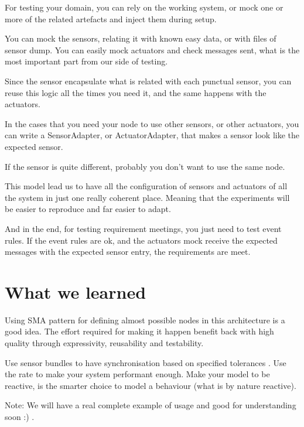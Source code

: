 \documentclass[a4paper,10pt,twoside]{book}
\begin{document}
				For testing your domain, you can rely on the working system, or mock one or more of the related artefacts and inject them during setup. 
				
				You can mock the sensors, relating it with known easy data, or with files of sensor dump.
				You can easily mock actuators and check messages sent, what is the most important part from our side of testing. 
				
				
				Since the sensor encapsulate what is related with each punctual sensor, you can reuse this logic all the times you need it, and the same happens with the actuators.
					
				In the cases that you need your node to use other sensors, or other actuators, you can write a SensorAdapter, or ActuatorAdapter, that makes a sensor look like the expected sensor. 
				
				If the sensor is quite different, probably you don't want to use the same node. 
				
				This model lead us to have all the configuration of sensors and actuators of all the system in just one really coherent place. Meaning that the experiments will be easier to reproduce and far easier to adapt. 
				
				
				
				And in the end, for testing requirement meetings, you just need to test event rules. If the event rules are ok, and the actuators mock receive the expected messages with the expected sensor entry, the requirements are meet. 

				
				\section{What we learned}
				
				Using SMA pattern for defining almost possible nodes in this architecture is a good idea. The effort required for making it happen benefit back with high quality through expressivity, reusability and testability. 
				 
				 
				Use sensor bundles to have synchronisation based on specified tolerances . Use the rate to make your system performant enough. Make your model to be reactive, is the smarter choice to model a behaviour (what is by nature reactive). 
				
				Note: We will have a real complete example of usage and good for understanding soon :) .
				
				


\ifx\wholebook\relax\else
\end{document}
